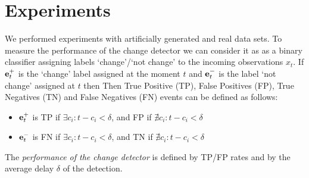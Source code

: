 \section{Experiments}
\label{sec:experiments}
We performed experiments with artificially generated and real
data sets.
To measure the performance of the change detector we can consider it as as a binary classifier assigning labels `change'/`not change' to the incoming observations $x_t$.
If
$\mathbf{e}_{t}^{+}$ is the `change' label assigned at the moment $t$
and
$\mathbf{e}_{t}^{-}$ is the label `not change' assigned at $t$
then
Then True Positive (TP), False Positives (FP), True Negatives (TN) and False Negatives (FN) events can be defined as follows:
\begin{itemize}[leftmargin=*]\setlength\itemsep{0em}
    \item $\mathbf{e}_{t}^{+}$ is TP if $\exists c_i:t-c_i<\delta$, and FP if $\nexists c_i:t-c_i<\delta$
    \item $\mathbf{e}_{t}^{-}$ is FN if $\exists c_i:t-c_i <\delta$, and TN if $\nexists c_i:t-c_i<\delta$
\end{itemize}
The \textit{performance of the change detector} is defined by TP/FP rates and by the average delay $\delta$ of the detection.

